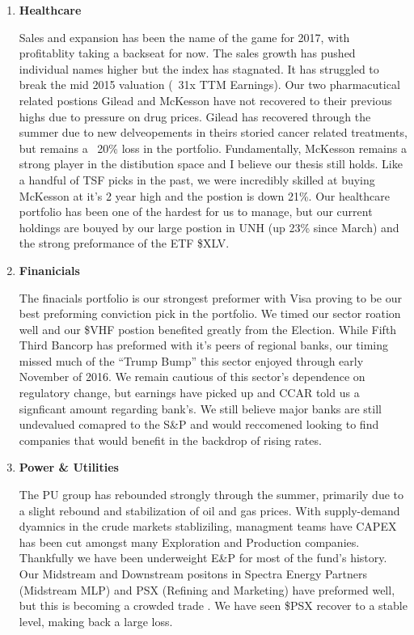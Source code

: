\documentclass[11pt,pressrelease]{newlfm} %
\begin{document}
\begin{newlfm}
\begin{singlespace}
\begin{enumerate}
\item \textbf{Healthcare} \par
Sales and expansion has been the name of the game for 2017, with profitablity taking a backseat for now. The sales growth has pushed individual names higher but the index has stagnated. It has struggled to break the mid 2015 valuation (~31x TTM Earnings). Our two pharmacutical related postions Gilead and McKesson have not recovered to their previous highs due to pressure on drug prices. Gilead has recovered through the summer due to new delveopements in theirs storied cancer related treatments, but remains a ~20\% loss in the portfolio. Fundamentally, McKesson remains a strong player in the distibution space and I believe our thesis still holds. Like a handful of TSF picks in the past, we were incredibly skilled at buying McKesson at it's 2 year high and the postion is down 21\%. Our healthcare portfolio has been one of the hardest for us to manage, but our current holdings are bouyed by our large postion in UNH (up 23\% since March) and the strong preformance of the ETF \$XLV.

\item \textbf{Finanicials} \par
The finacials portfolio is our strongest preformer with Visa proving to be our best preforming conviction pick in the portfolio. We timed our sector roation well and our \$VHF postion benefited greatly from the Election. While Fifth Third Bancorp has preformed with it's peers of regional banks, our timing missed much of the ``Trump Bump'' this sector enjoyed through early November of 2016. We remain cautious of this sector's dependence on regulatory change, but earnings have picked up and CCAR told us a signficant amount regarding bank's. We still believe major banks are still undevalued comapred to the S\&P and would reccomened looking to find companies that would benefit in the backdrop of rising rates.

\item \textbf{Power \& Utilities} \par
The PU group has rebounded strongly through the summer, primarily due to a slight rebound and stabilization of oil and gas prices. With supply-demand dyamnics in the crude markets stabliziling, managment teams have  CAPEX has been cut amongst many Exploration and Production companies. Thankfully we have been underweight E\&P for most of the fund's history. Our Midstream and Downstream positons in Spectra Energy Partners (Midstream MLP) and PSX (Refining and Marketing) have preformed well, but this is becoming a crowded trade . We have seen \$PSX recover to a stable level, making back a large loss. 


\end{enumerate}
\end{singlespace}
\end{newlfm}
\end{document}

